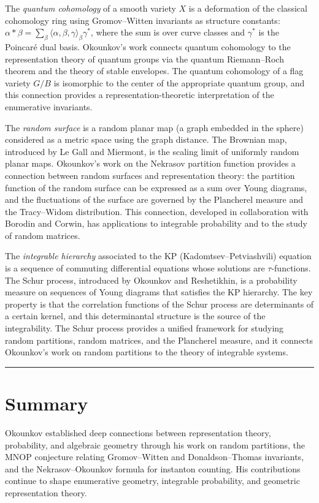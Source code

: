 The \emph{quantum cohomology} of a smooth variety $X$ is a deformation of the classical cohomology ring using Gromov--Witten invariants as structure constants: $\alpha * \beta = \sum_\beta \langle \alpha, \beta, \gamma \rangle_\beta \gamma^*$, where the sum is over curve classes and $\gamma^*$ is the Poincar\'{e} dual basis. Okounkov's work connects quantum cohomology to the representation theory of quantum groups via the quantum Riemann--Roch theorem and the theory of stable envelopes. The quantum cohomology of a flag variety $G/B$ is isomorphic to the center of the appropriate quantum group, and this connection provides a representation-theoretic interpretation of the enumerative invariants.

The \emph{random surface} is a random planar map (a graph embedded in the sphere) considered as a metric space using the graph distance. The Brownian map, introduced by Le Gall and Miermont, is the scaling limit of uniformly random planar maps. Okounkov's work on the Nekrasov partition function provides a connection between random surfaces and representation theory: the partition function of the random surface can be expressed as a sum over Young diagrams, and the fluctuations of the surface are governed by the Plancherel measure and the Tracy--Widom distribution. This connection, developed in collaboration with Borodin and Corwin, has applications to integrable probability and to the study of random matrices.

The \emph{integrable hierarchy} associated to the KP (Kadomtsev--Petviashvili) equation is a sequence of commuting differential equations whose solutions are $\tau$-functions. The Schur process, introduced by Okounkov and Reshetikhin, is a probability measure on sequences of Young diagrams that satisfies the KP hierarchy. The key property is that the correlation functions of the Schur process are determinants of a certain kernel, and this determinantal structure is the source of the integrability. The Schur process provides a unified framework for studying random partitions, random matrices, and the Plancherel measure, and it connects Okounkov's work on random partitions to the theory of integrable systems.

\begin{center}\rule{0.5\linewidth}{0.5pt}\end{center}

\section*{Summary}

Okounkov established deep connections between representation theory, probability, and algebraic geometry through his work on random partitions, the MNOP conjecture relating Gromov--Witten and Donaldson--Thomas invariants, and the Nekrasov--Okounkov formula for instanton counting. His contributions continue to shape enumerative geometry, integrable probability, and geometric representation theory.
